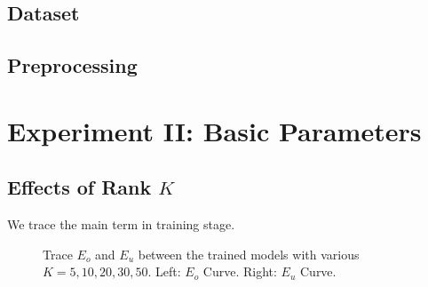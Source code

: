 \documentclass{article} %
\begin{document}
\subsection{Dataset} 

\subsection{Preprocessing}

\section{Experiment II: Basic Parameters} %

\subsection{Effects of Rank $K$}
We trace the main term in training stage.
\begin{figure}[hp]
    \centering
    \captionsetup{justification=centering}
    \caption{Trace $E_o$ and $E_u$ between the trained models with various
        $K=5,10,20,30,50$. \newline
        Left: $E_o$ Curve. Right: $E_u$ Curve. } 
    \label{EffectK:Eo_Eu}
\end{figure}
\end{document}
